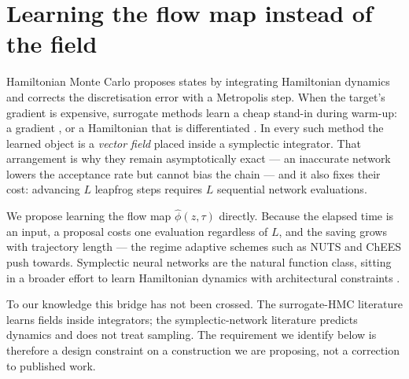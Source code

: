 \documentclass[mlabstract,onecolumn]{jmlr}
\begin{document}
\section{Learning the flow map instead of the field}

Hamiltonian Monte Carlo \citep{Brooks_2011} proposes states by integrating
Hamiltonian dynamics and corrects the discretisation error with a Metropolis
step. When the target's gradient is expensive, surrogate methods learn a cheap
stand-in during warm-up: a gradient \citep{Li_2019}, or a Hamiltonian that is
differentiated \citep{DHULIPALA2023112425}. In every such method the learned
object is a \emph{vector field} placed inside a symplectic integrator. That
arrangement is why they remain asymptotically exact --- an inaccurate network
lowers the acceptance rate but cannot bias the chain --- and it also fixes their
cost: advancing $L$ leapfrog steps requires $L$ sequential network evaluations.

We propose learning the flow map $\hat\phi(z,\tau)$ directly. Because the
elapsed time is an input, a proposal costs one evaluation regardless of $L$, and
the saving grows with trajectory length --- the regime adaptive schemes such as
NUTS \citep{hoffman2011nouturn} and ChEES \citep{hoffman2021adaptive} push
towards. Symplectic neural networks \citep[SympNets;][]{jin2020sympnets} are the
natural function class, sitting in a broader effort to learn Hamiltonian
dynamics with architectural constraints
\citep{greydanus2019hamiltonian,chen2019neural}.

To our knowledge this bridge has not been crossed. The surrogate-HMC literature
learns fields inside integrators; the symplectic-network literature predicts
dynamics and does not treat sampling. The requirement we identify below is
therefore a design constraint on a construction we are proposing, not a
correction to published work.
\end{document}
